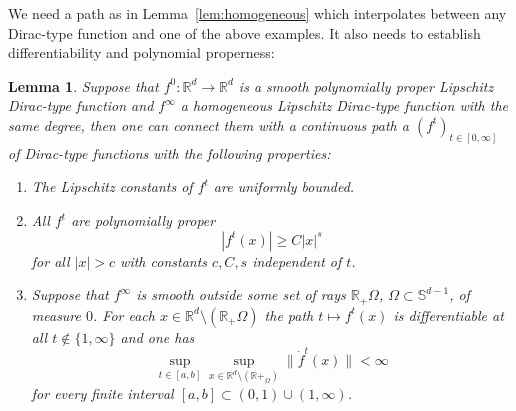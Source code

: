 \documentclass[12pt]{amsart}
\newtheorem{lemma}[theorem]{Lemma}
\newcommand{\RM}{{\mathbb R}}
\newcommand{\SM}{{\mathbb S}}
\begin{document}
We need a path as in Lemma~\ref{lem:homogeneous} which interpolates between any Dirac-type function and one of the above examples. It also needs to establish differentiability and polynomial properness:
\begin{lemma}
\label{lem:homogeneous2}
Suppose that $f^0:\RM^d \to \RM^d$ is a smooth polynomially proper Lipschitz Dirac-type function and $f^\infty$ a homogeneous Lipschitz Dirac-type function with the same degree, then one can connect them with a continuous path a $(f^t)_{t\in [0,\infty]}$ of Dirac-type functions with the following properties:
\begin{enumerate}
    \item[(i)] The Lipschitz constants of $f^{t}$ are uniformly bounded.
    \item[(ii)] All $f^{t}$ are polynomially proper
    $$|f^{t}(x)|\geq C |x|^s$$
    for all $|x|>c$ with constants $c,C,s$ independent of $t$.
    \item[(iii)] Suppose that $f^\infty$ is smooth outside some set of rays $\RM_+\Omega$, $\Omega\subset \SM^{d-1}$, of measure $0$. For each $x\in \RM^d \setminus (\RM_+\Omega)$ the path $t\mapsto f^{t}(x)$ is differentiable at all $t\notin \{1,\infty\}$ and one has $$\sup_{t\in [a,b]} \sup_{x\in \RM^d \setminus (\RM+_\Omega)}\|\dot{f}^{t}(x)\| < \infty$$
    for every finite interval $[a,b] \subset (0,1) \cup (1,\infty)$.
\end{enumerate}
\end{lemma}
\end{document}
